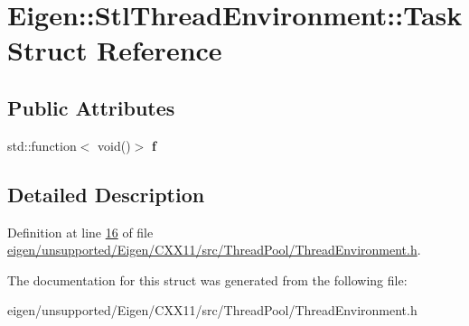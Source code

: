 \hypertarget{struct_eigen_1_1_stl_thread_environment_1_1_task}{}\section{Eigen\+:\+:Stl\+Thread\+Environment\+:\+:Task Struct Reference}
\label{struct_eigen_1_1_stl_thread_environment_1_1_task}
\subsection*{Public Attributes}
\begin{DoxyCompactItemize}
\item 
\mbox{\label{struct_eigen_1_1_stl_thread_environment_1_1_task_abf6221f502964d796167da4e7806cf1c}} 
std\+::function$<$ void()$>$ {\bfseries f}
\end{DoxyCompactItemize}


\subsection{Detailed Description}


Definition at line \hyperlink{eigen_2unsupported_2_eigen_2_c_x_x11_2src_2_thread_pool_2_thread_environment_8h_source_l00016}{16} of file \hyperlink{eigen_2unsupported_2_eigen_2_c_x_x11_2src_2_thread_pool_2_thread_environment_8h_source}{eigen/unsupported/\+Eigen/\+C\+X\+X11/src/\+Thread\+Pool/\+Thread\+Environment.\+h}.



The documentation for this struct was generated from the following file\+:\begin{DoxyCompactItemize}
\item 
eigen/unsupported/\+Eigen/\+C\+X\+X11/src/\+Thread\+Pool/\+Thread\+Environment.\+h\end{DoxyCompactItemize}
